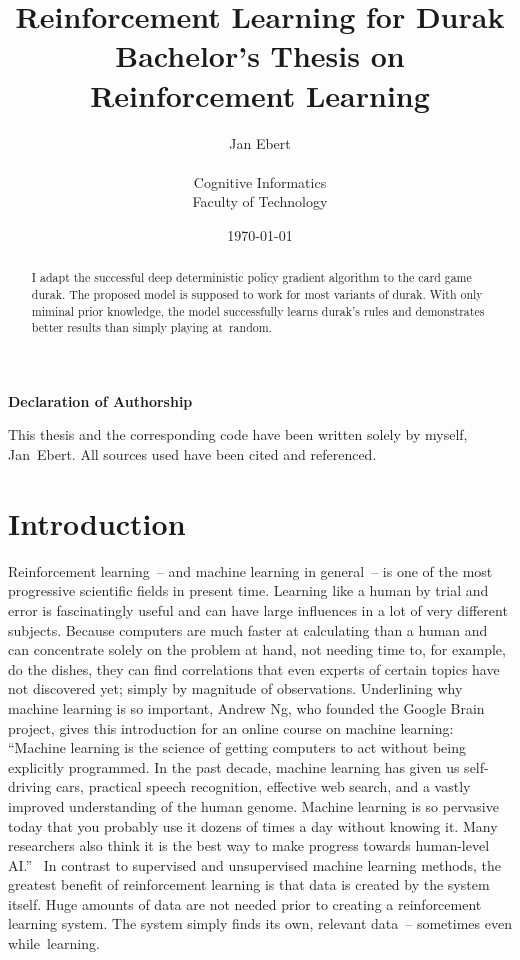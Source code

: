 \documentclass[a4paper,titlepage]{article}
\title{Reinforcement Learning for Durak \\ \medskip \large{Bachelor's Thesis on Reinforcement Learning}}
\author{Jan Ebert \smallskip \\ \\ \small{Cognitive Informatics} \\ \small{Faculty of Technology}}
\date{\today}
\begin{document}
\maketitle

\setcounter{page}{2}
\thispagestyle{empty}
\noindent
\textbf{Declaration of Authorship} \medskip

\noindent
This thesis and the corresponding code have been written solely by myself, Jan~Ebert. All sources used have been cited and referenced. \bigskip

\noindent
\makebox[3cm]{\hrulefill} \hspace{0.2cm} \makebox[4cm]{\hrulefill}

\noindent
{} \hspace{0.2cm} 

\begin{abstract}
\setcounter{page}{3}
I adapt the successful deep deterministic policy gradient algorithm to the card game durak. The proposed model is supposed to work for most variants of durak. With only miminal prior knowledge, the model successfully learns durak's rules and demonstrates better results than simply playing at~random.
\end{abstract}

\setcounter{page}{4}
\thispagestyle{empty}
\tableofcontents

\newpage


\section{Introduction}

Reinforcement learning~-- and machine learning in general~-- is one of the most progressive scientific fields in present time. Learning like a human by trial and error is fascinatingly useful and can have large influences in a lot of very different subjects. Because computers are much faster at calculating than a human and can concentrate solely on the problem at hand, not needing time to, for example, do the dishes, they can find correlations that even experts of certain topics have not discovered yet; simply by magnitude of observations. Underlining why machine learning is so important, Andrew Ng, who founded the Google Brain project, gives this introduction for an online course on machine learning: ``Machine learning is the science of getting computers to act without being explicitly programmed. In the past decade, machine learning has given us self-driving cars, practical speech recognition, effective web search, and a vastly improved understanding of the human genome. Machine learning is so pervasive today that you probably use it dozens of times a day without knowing it. Many researchers also think it is the best way to make progress towards human-level AI.''~\cite{mlquote}
In contrast to supervised and unsupervised machine learning methods, the greatest benefit of reinforcement learning is that data is created by the system itself. Huge amounts of data are not needed prior to creating a reinforcement learning system. The system simply finds its own, relevant data~-- sometimes even while~learning.
\end{document}
